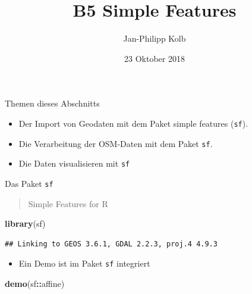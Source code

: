 \documentclass[ignorenonframetext,]{beamer}
\title{B5 Simple Features}
\author{Jan-Philipp Kolb}
\date{23 Oktober 2018}
\newenvironment{Shaded}{\begin{snugshade}}{\end{snugshade}}
\newcommand{\KeywordTok}[1]{\textcolor[rgb]{0.13,0.29,0.53}{\textbf{#1}}}
\newcommand{\OperatorTok}[1]{\textcolor[rgb]{0.81,0.36,0.00}{\textbf{#1}}}
\newcommand{\NormalTok}[1]{#1}
\providecommand{\tightlist}{%
  \setlength{\itemsep}{0pt}\setlength{\parskip}{0pt}}
\begin{document}
\frame{\titlepage}

\begin{frame}[fragile]{Themen dieses Abschnitts}

\begin{itemize}
\tightlist
\item
  Der Import von Geodaten mit dem Paket simple features (\texttt{sf}).
\item
  Die Verarbeitung der OSM-Daten mit dem Paket \texttt{sf}.
\item
  Die Daten visualisieren mit \texttt{sf}
\end{itemize}

\end{frame}

\begin{frame}[fragile]{Das Paket \texttt{sf}}

\begin{quote}
Simple Features for R
\end{quote}

\begin{Shaded}
\begin{Highlighting}[]
\KeywordTok{library}\NormalTok{(sf)}
\end{Highlighting}
\end{Shaded}

\begin{verbatim}
## Linking to GEOS 3.6.1, GDAL 2.2.3, proj.4 4.9.3
\end{verbatim}

\begin{itemize}
\tightlist
\item
  Ein Demo ist im Paket \texttt{sf} integriert
\end{itemize}

\begin{Shaded}
\begin{Highlighting}[]
\KeywordTok{demo}\NormalTok{(sf}\OperatorTok{::}\NormalTok{affine)}
\end{Highlighting}
\end{Shaded}


\end{frame}
\end{document}
